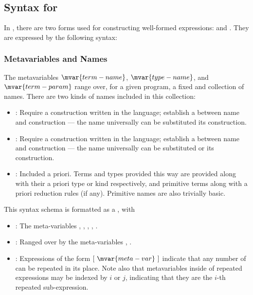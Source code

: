 \subsection{Syntax for \LangA}

In \LangA, there are two forms used for constructing well-formed expressions:  and .
They are expressed by the following syntax:



\subsubsection{Metavariables and Names}
The metavariables $\mvar{term-name}$, $\mvar{type-name}$, and $\mvar{term-param}$ range over, for a given program, a fixed and collection of names.
There are two kinds of names included in this collection:
\begin{itemize}
\item {}: Require a construction written in the language; establish a  between name and construction --- the name universally can be substituted  its construction.
\item {}: Require a construction written in the language; establish a  between name and construction --- the name universally can be substituted  or  its construction.
\item {}: Included a priori. Terms and types provided this way are provided along with their a priori type or kind respectively, and primitive terms along with a priori reduction rules (if any). Primitive names are also trivially basic.
\end{itemize}

This syntax schema is formatted as a , with
\begin{itemize}
  \item
  : The meta-variables , , , , .
  \item
  : Ranged over by the meta-variables , .
  \item
  : Expressions of the form $[~\mvar{meta-var}~]$ indicate that any number of  can be repeated in its place.
  Note also that metavariables inside of repeated expressions may be indexed by $i$ or $j$, indicating that they are the $i$-th repeated sub-expression.
\end{itemize}

